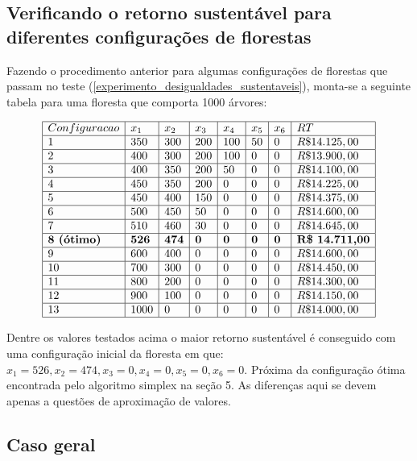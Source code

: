 \documentclass[a4paper, 12pt]{article}
\begin{document}
\subsection{Verificando o retorno sustentável para diferentes configurações de florestas}

Fazendo o procedimento anterior para algumas configurações de florestas que passam no teste (\ref{experimento_desigualdades_sustentaveis}), monta-se a seguinte tabela para uma floresta que comporta 1000 árvores:

$$\begin{array}{ | l | l | l | l | l | l | l | l | }
\hline
	Configuracao & x_1 & x_2 & x_3 & x_4 & x_5 & x_6 & RT \\ \hline
	1 & 350 & 300 & 200 & 100 & 50 & 0 & R\$ 14.125,00 \\ \hline
	2 & 400 & 300 & 200 & 100 & 0 & 0 & R\$ 13.900,00 \\ \hline
	3 & 400 & 350 & 200 & 50 & 0 & 0 & R\$ 14.100,00 \\ \hline
	4 & 450 & 350 & 200 & 0 & 0 & 0 & R\$ 14.225,00 \\ \hline
	5 & 450 & 400 & 150 & 0 & 0 & 0 & R\$ 14.375,00 \\ \hline
	6 & 500 & 450 & 50 & 0 & 0 & 0 & R\$ 14.600,00 \\ \hline
	7 & 510 & 460 & 30 & 0 & 0 & 0 & R\$ 14.645,00 \\ \hline
	\textbf{8 (ótimo)} & \textbf{526} & \textbf{474} & \textbf{0} & \textbf{0} & \textbf{0} & \textbf{0} & \textbf{R\$ 14.711,00} \\ \hline
	9 & 600 & 400 & 0 & 0 & 0 & 0 & R\$ 14.600,00 \\ \hline
	10 & 700 & 300 & 0 & 0 & 0 & 0 & R\$ 14.450,00 \\ \hline
	11 & 800 & 200 & 0 & 0 & 0 & 0 & R\$ 14.300,00 \\ \hline
	12 & 900 & 100 & 0 & 0 & 0 & 0 & R\$ 14.150,00 \\ \hline
	13 & 1000 & 0 & 0 & 0 & 0 & 0 & R\$ 14.000,00 \\ \hline
\end{array}
$$

Dentre os valores testados acima o maior retorno sustentável é conseguido com uma configuração inicial da floresta em que: $x_1=526, x_2=474, x_3=0, x_4=0, x_5=0, x_6=0 $.
Próxima da configuração ótima encontrada pelo algoritmo simplex na seção 5. As diferenças aqui se devem apenas a questões de aproximação de valores.

\subsection{Caso geral}
\end{document}
